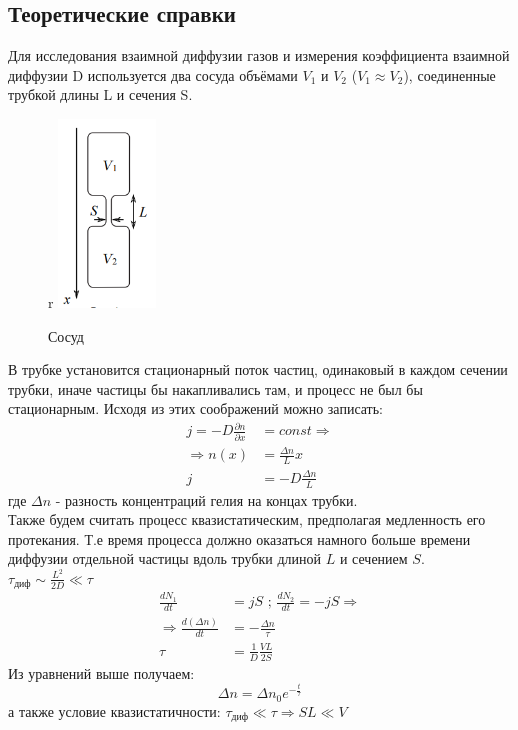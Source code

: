 \subsection*{Теоретические справки}
Для исследования взаимной диффузии газов и
измерения коэффициента взаимной диффузии D используется два сосуда
объёмами $V_1$ и $V_2$ ($V_1 \approx V_2$), соединенные трубкой длины L и сечения S.\\ 
\begin{figure}{r}
    \centering
    \includegraphics[height=5cm]{setup1.png}
    \caption{Сосуд}
\end{figure}
\indent
В трубке установится стационарный поток частиц, одинаковый в каждом 
сечении трубки, иначе частицы бы накапливались там, и процесс не был бы 
стационарным. Исходя из этих соображений можно записать:
\begin{align}
    j = -D\frac{\partial n}{\partial x} &= const \Rightarrow\\ 
    \Rightarrow n(x) &= \frac{\Delta n}{L}x\\ 
    j &= -D\frac{\Delta n}{L}
\end{align}
где $\Delta n$ - разность концентраций гелия на концах трубки.\\\indent
Также будем считать процесс квазистатическим, предполагая медленность его
протекания. Т.е время процесса должно оказаться намного больше времени 
диффузии отдельной частицы вдоль трубки длиной $L$ и сечением $S$. 
$\tau_{\text{диф}} \sim \frac{L^2}{2D} \ll \tau$
\begin{align}
    \frac{dN_1}{dt} &= jS\text{  ;  }\frac{dN_2}{dt} = -jS \Rightarrow\\ 
    \Rightarrow \frac{d(\Delta n)}{dt} &= -\frac{\Delta n}{\tau} \\ 
    \tau &= \frac{1}{D}\frac{VL}{2S}
\end{align}
Из уравнений выше получаем:
\begin{equation}
    \Delta n = \Delta n_0e^{-\frac{t}{\tau}}
\end{equation}
а также условие квазистатичности: $\tau_{\text{диф}} \ll \tau \Rightarrow SL \ll V$
